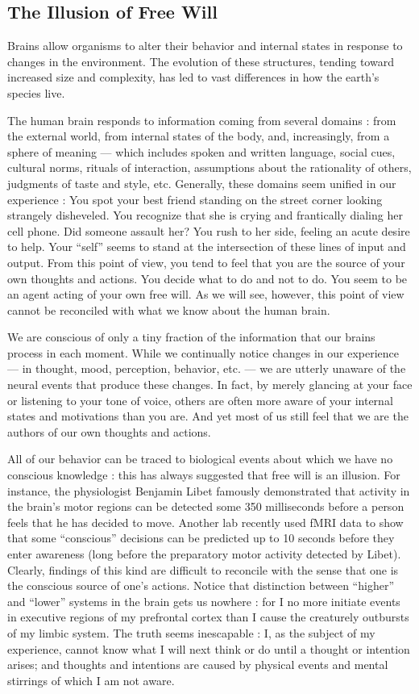 \documentclass[a4paper,14pt]{extbook}
\begin{document}
\subsection{The Illusion of Free Will}

Brains allow organisms to alter their behavior and internal states in response to changes in the environment.
The evolution of these structures, tending toward increased size and complexity, has led to vast differences in how the earth’s species live.

The human brain responds to information coming from several domains :
from the external world, from internal states of the body, and, increasingly, from a sphere of meaning --- which includes spoken and written language, social cues, cultural norms, rituals of interaction, assumptions about the rationality of others, judgments of taste and style, etc.
Generally, these domains seem unified in our experience :
You spot your best friend standing on the street corner looking strangely disheveled.
You recognize that she is crying and frantically dialing her cell phone.
Did someone assault her?
You rush to her side, feeling an acute desire to help.
Your ``self'' seems to stand at the intersection of these lines of input and output.
From this point of view, you tend to feel that you are the source of your own thoughts and actions.
You decide what to do and not to do.
You seem to be an agent acting of your own free will.
As we will see, however, this point of view cannot be reconciled with what we know about the human brain.

We are conscious of only a tiny fraction of the information that our brains process in each moment.
While we continually notice changes in our experience --- in thought, mood, perception, behavior, etc. --- we are utterly unaware of the neural events that produce these changes.
In fact, by merely glancing at your face or listening to your tone of voice, others are often more aware of your internal states and motivations than you are.
And yet most of us still feel that we are the authors of our own thoughts and actions.

All of our behavior can be traced to biological events about which we have no conscious knowledge :
this has always suggested that free will is an illusion.
For instance, the physiologist Benjamin Libet famously demonstrated that activity in the brain’s motor regions can be detected some 350 milliseconds before a person feels that he has decided to move.
Another lab recently used fMRI data to show that some ``conscious'' decisions can be predicted up to 10 seconds before they enter awareness (long before the preparatory motor activity detected by Libet).
Clearly, findings of this kind are difficult to reconcile with the sense that one is the conscious source of one’s actions.
Notice that distinction between ``higher'' and ``lower'' systems in the brain gets us nowhere :
for I no more initiate events in executive regions of my prefrontal cortex than I cause the creaturely outbursts of my limbic system.
The truth seems inescapable :
I, as the subject of my experience, cannot know what I will next think or do until a thought or intention arises;
and thoughts and intentions are caused by physical events and mental stirrings of which I am not aware.
\end{document}
